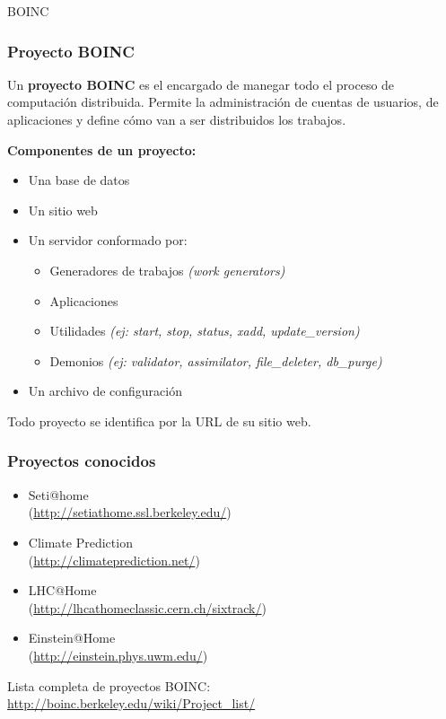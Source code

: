 \begin{subsection}{BOINC}
	\begin{frame}\frametitle{Proyecto BOINC}
		\begin{block}{}
			Un \textbf{proyecto BOINC} es el encargado de manegar todo el proceso de computación distribuida. Permite la 
			administración de cuentas de usuarios, de aplicaciones y define cómo van a ser distribuidos los trabajos.
		\end{block}
		\pause
		\vspace{2mm}
		\textbf{Componentes de un proyecto:}
		\begin{itemize}
			\item Una base de datos
			\item Un sitio web
			\item Un servidor conformado por:
			\begin{itemize}
				\item Generadores de trabajos \textit{(work generators)}
				\item Aplicaciones
				\item Utilidades \textit{(ej: start, stop, status, xadd, update\_version)}
				\item Demonios \textit{(ej: validator, assimilator, file\_deleter, db\_purge)}
			\end{itemize}
			\item Un archivo de configuración 
		\end{itemize}
		\vspace{2mm}
		\begin{block}{}
			Todo proyecto se identifica por la URL de su sitio web.
		\end{block}	
	\end{frame}
	
	\begin{frame}\frametitle{Proyectos conocidos}
		\begin{itemize}
		\addtolength{\itemsep}{2mm}
			\item Seti@home\\ (\url{http://setiathome.ssl.berkeley.edu/})
			\item Climate Prediction\\ (\url{http://climateprediction.net/})
			\item LHC@Home\\ (\url{http://lhcathomeclassic.cern.ch/sixtrack/})
			\item Einstein@Home\\ (\url{http://einstein.phys.uwm.edu/})			
		\end{itemize}
		\vspace{6mm}
		Lista completa de proyectos BOINC:\\
		\url{http://boinc.berkeley.edu/wiki/Project_list/}
	\end{frame}
	


\end{subsection}

